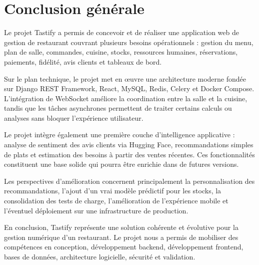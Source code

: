 \chapter*{Conclusion générale}

Le projet Tastify a permis de concevoir et de réaliser une application web de gestion de restaurant couvrant plusieurs besoins opérationnels : gestion du menu, plan de salle, commandes, cuisine, stocks, ressources humaines, réservations, paiements, fidélité, avis clients et tableaux de bord.

Sur le plan technique, le projet met en œuvre une architecture moderne fondée sur Django REST Framework, React, MySQL, Redis, Celery et Docker Compose. L'intégration de WebSocket améliore la coordination entre la salle et la cuisine, tandis que les tâches asynchrones permettent de traiter certains calculs ou analyses sans bloquer l'expérience utilisateur.

Le projet intègre également une première couche d'intelligence applicative : analyse de sentiment des avis clients via Hugging Face, recommandations simples de plats et estimation des besoins à partir des ventes récentes. Ces fonctionnalités constituent une base solide qui pourra être enrichie dans de futures versions.

Les perspectives d'amélioration concernent principalement la personnalisation des recommandations, l'ajout d'un vrai modèle prédictif pour les stocks, la consolidation des tests de charge, l'amélioration de l'expérience mobile et l'éventuel déploiement sur une infrastructure de production.

En conclusion, Tastify représente une solution cohérente et évolutive pour la gestion numérique d'un restaurant. Le projet nous a permis de mobiliser des compétences en conception, développement backend, développement frontend, bases de données, architecture logicielle, sécurité et validation.
